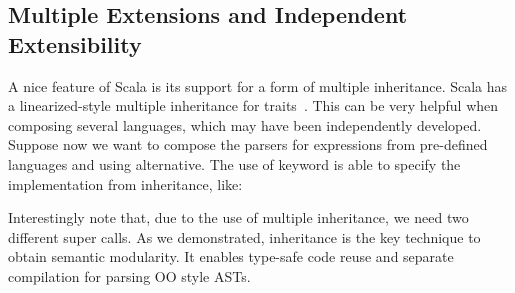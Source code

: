 \subsection{Multiple Extensions and Independent Extensibility}
A nice feature of Scala is its support for a form of multiple inheritance.
Scala has a linearized-style multiple inheritance for traits~\cite{}. 
This can be very helpful when composing several languages, which 
may have been independently developed. Suppose now
we want to compose the parsers for expressions from pre-defined
languages  and  using
alternative.
The use of keyword  is able to
specify the implementation from inheritance, like:


Interestingly note that, due to the use of multiple inheritance, we 
need two different super calls.
As we demonstrated, inheritance is the key technique to obtain semantic modularity.
It enables type-safe code reuse and separate compilation for parsing OO style ASTs.
